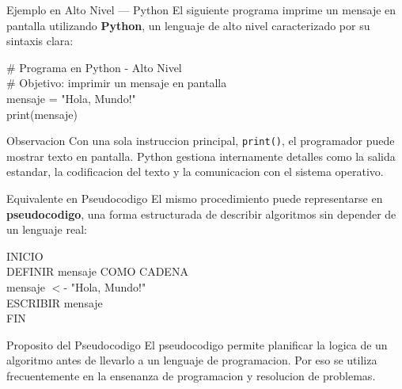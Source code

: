 \documentclass[10pt, aspectratio=169]{beamer}
\newcommand{\codigobox}[1]{
	\begin{block}{}
		\colorbox{codigofondo}{
			\begin{minipage}{0.96\textwidth}
				\ttfamily\scriptsize
				#1
			\end{minipage}
		}
	\end{block}
}
\begin{document}
	\begin{frame}{Ejemplo en Alto Nivel --- Python}
		El siguiente programa imprime un mensaje en pantalla utilizando \textbf{Python},
		un lenguaje de alto nivel caracterizado por su sintaxis clara:
		
		\vspace{0.3cm}
		
		\codigobox{
			\# Programa en Python - Alto Nivel\\
			\# Objetivo: imprimir un mensaje en pantalla\\[0.15cm]
			mensaje = "Hola, Mundo!"\\
			print(mensaje)
		}
		
		\vspace{0.3cm}
		\begin{block}{Observacion}
			Con una sola instruccion principal, \texttt{print()}, el programador puede
			mostrar texto en pantalla. Python gestiona internamente detalles como la salida
			estandar, la codificacion del texto y la comunicacion con el sistema operativo.
		\end{block}
	\end{frame}
	
	\begin{frame}{Equivalente en Pseudocodigo}
		El mismo procedimiento puede representarse en \textbf{pseudocodigo}, una forma
		estructurada de describir algoritmos sin depender de un lenguaje real:
		
		\vspace{0.3cm}
		
		\codigobox{
			INICIO\\
			\hspace*{0.4cm}DEFINIR mensaje COMO CADENA\\
			\hspace*{0.4cm}mensaje $<$- "Hola, Mundo!"\\
			\hspace*{0.4cm}ESCRIBIR mensaje\\
			FIN
		}
		
		\vspace{0.3cm}
		\begin{block}{Proposito del Pseudocodigo}
			El pseudocodigo permite planificar la logica de un algoritmo antes de llevarlo
			a un lenguaje de programacion. Por eso se utiliza frecuentemente en la ensenanza
			de programacion y resolucion de problemas.
		\end{block}
	\end{frame}
	
\end{document}
